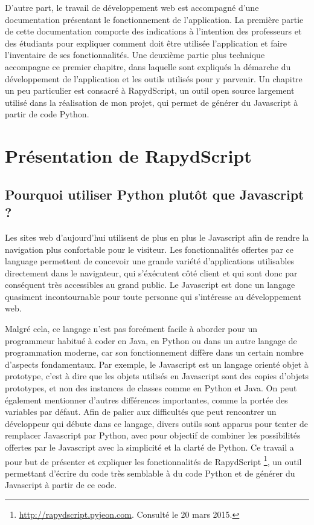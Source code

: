\documentclass[a4,10pt,french]{sphinxmanual}
\begin{document}
D'autre part, le travail de développement web est accompagné
d'une documentation présentant le fonctionnement de l'application. La première partie de
cette documentation
comporte des indications à l'intention des professeurs et des étudiants pour expliquer
comment doit être utilisée l'application et faire l'inventaire de ses fonctionnalités.
Une deuxième partie plus technique accompagne ce premier chapitre, dans laquelle sont expliqués
la démarche du développement de l'application et les outils utilisés pour y parvenir. Un chapitre
un peu particulier
est consacré à RapydScript, un outil open source largement utilisé dans la réalisation
de mon projet, qui permet de générer du Javascript à partir de code Python.


\chapter{Présentation de RapydScript}
\label{rapydscript::doc}\label{rapydscript:presentation-de-rapydscript}

\section{Pourquoi utiliser Python plutôt que Javascript ?}
\label{rapydscript:pourquoi-utiliser-python-plutot-que-javascript}
Les sites web d'aujourd'hui utilisent de plus en plus le Javascript afin de rendre la navigation plus confortable pour le visiteur. Les fonctionnalités offertes par ce language permettent de concevoir une grande variété d'applications utilisables directement dans le navigateur, qui s'éxécutent côté client et qui sont donc par conséquent très accessibles au grand public. Le Javascript est donc un langage quasiment incontournable pour toute personne qui s'intéresse au développement web.

Malgré cela, ce langage n'est pas forcément facile à aborder pour un programmeur habitué à coder en Java, en Python ou dans un autre langage de programmation moderne, car son fonctionnement diffère dans un certain nombre d'aspects fondamentaux. Par exemple, le Javascript est un langage orienté objet à prototype, c'est à dire que les objets utilisés en Javascript sont des copies d'objets prototypes, et non des instances de classes comme en Python et Java. On peut également mentionner d'autres différences importantes, comme la portée des variables par défaut. Afin de palier aux difficultés que peut rencontrer un développeur qui débute dans ce langage, divers outils sont apparus pour tenter de remplacer Javascript par Python, avec pour objectif de combiner les possibilités offertes par le Javascript avec la simplicité et la clarté de Python. Ce travail a pour but de présenter et expliquer les fonctionnalités de RapydScript \footnote{
\href{http://rapydscript.pyjeon.com}{http://rapydscript.pyjeon.com}. Consulté le 20 mars 2015.
}, un outil permettant d'écrire du code très semblable à du code Python et de générer du Javascript à partir de ce code.
\end{document}
